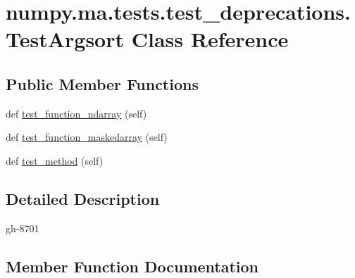 \hypertarget{classnumpy_1_1ma_1_1tests_1_1test__deprecations_1_1TestArgsort}{}\section{numpy.\+ma.\+tests.\+test\+\_\+deprecations.\+Test\+Argsort Class Reference}
\label{classnumpy_1_1ma_1_1tests_1_1test__deprecations_1_1TestArgsort}
\subsection*{Public Member Functions}
\begin{DoxyCompactItemize}
\item 
def \hyperlink{classnumpy_1_1ma_1_1tests_1_1test__deprecations_1_1TestArgsort_af155b242fbc0baf810e2cff29d0bdf06}{test\+\_\+function\+\_\+ndarray} (self)
\item 
def \hyperlink{classnumpy_1_1ma_1_1tests_1_1test__deprecations_1_1TestArgsort_ad8bbe167c457cade3c6e09564f610498}{test\+\_\+function\+\_\+maskedarray} (self)
\item 
def \hyperlink{classnumpy_1_1ma_1_1tests_1_1test__deprecations_1_1TestArgsort_af26de0bebd8058d720d9f08c217e6954}{test\+\_\+method} (self)
\end{DoxyCompactItemize}


\subsection{Detailed Description}
\begin{DoxyVerb}gh-8701 \end{DoxyVerb}
 

\subsection{Member Function Documentation}
\mbox{\label{classnumpy_1_1ma_1_1tests_1_1test__deprecations_1_1TestArgsort_ad8bbe167c457cade3c6e09564f610498}} 
